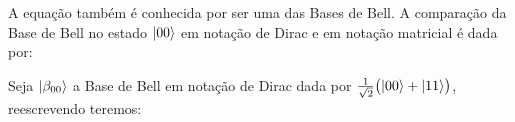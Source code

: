 A equação também é conhecida por ser uma das Bases de Bell. A comparação da Base de Bell no estado $\ket{00}$ em notação de Dirac e em notação matricial é dada por:

Seja \(\ket{\beta_{00}}\) a Base de Bell em notação de Dirac dada por \(\frac{1}{\sqrt{2}} \bigl(\ket{00} + \ket{11}\bigr)\), reescrevendo teremos:

%
